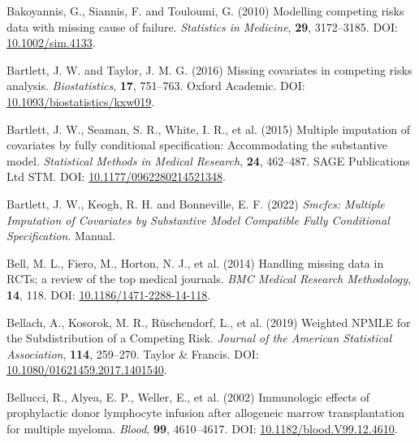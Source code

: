 \documentclass[
  letterpaper,
  DIV=11,
  numbers=noendperiod]{scrreprt}
\newlength{\cslhangindent}
\newlength{\cslentryspacingunit} %
\newenvironment{CSLReferences}[2] %
 {%
  \setlength{\parindent}{0pt}
  \ifodd #1
  \let\oldpar\par
  \def\par{\hangindent=\cslhangindent\oldpar}
  \fi
  \setlength{\parskip}{#2\cslentryspacingunit}
 }%
 {}
\begin{document}
\begin{CSLReferences}{1}{0}
\leavevmode{}%
Bakoyannis, G., Siannis, F. and Touloumi, G. (2010) Modelling competing
risks data with missing cause of failure. \emph{Statistics in Medicine},
\textbf{29}, 3172--3185. DOI:
\href{https://doi.org/10.1002/sim.4133}{10.1002/sim.4133}.

\leavevmode{}%
Bartlett, J. W. and Taylor, J. M. G. (2016) Missing covariates in
competing risks analysis. \emph{Biostatistics}, \textbf{17}, 751--763.
Oxford Academic. DOI:
\href{https://doi.org/10.1093/biostatistics/kxw019}{10.1093/biostatistics/kxw019}.

\leavevmode{}%
Bartlett, J. W., Seaman, S. R., White, I. R., et al. (2015) Multiple
imputation of covariates by fully conditional specification:
{Accommodating} the substantive model. \emph{Statistical Methods in
Medical Research}, \textbf{24}, 462--487. SAGE Publications Ltd STM.
DOI:
\href{https://doi.org/10.1177/0962280214521348}{10.1177/0962280214521348}.

\leavevmode{}%
Bartlett, J. W., Keogh, R. H. and Bonneville, E. F. (2022) \emph{Smcfcs:
{Multiple} Imputation of Covariates by Substantive Model Compatible
Fully Conditional Specification}. Manual.

\leavevmode{}%
Bell, M. L., Fiero, M., Horton, N. J., et al. (2014) Handling missing
data in {RCTs}; a review of the top medical journals. \emph{BMC Medical
Research Methodology}, \textbf{14}, 118. DOI:
\href{https://doi.org/10.1186/1471-2288-14-118}{10.1186/1471-2288-14-118}.

\leavevmode{}%
Bellach, A., Kosorok, M. R., Rüschendorf, L., et al. (2019) Weighted
{NPMLE} for the {Subdistribution} of a {Competing Risk}. \emph{Journal
of the American Statistical Association}, \textbf{114}, 259--270. Taylor
\& Francis. DOI:
\href{https://doi.org/10.1080/01621459.2017.1401540}{10.1080/01621459.2017.1401540}.

\leavevmode{}%
Bellucci, R., Alyea, E. P., Weller, E., et al. (2002) Immunologic
effects of prophylactic donor lymphocyte infusion after allogeneic
marrow transplantation for multiple myeloma. \emph{Blood}, \textbf{99},
4610--4617. DOI:
\href{https://doi.org/10.1182/blood.V99.12.4610}{10.1182/blood.V99.12.4610}.


\end{CSLReferences}
\end{document}
